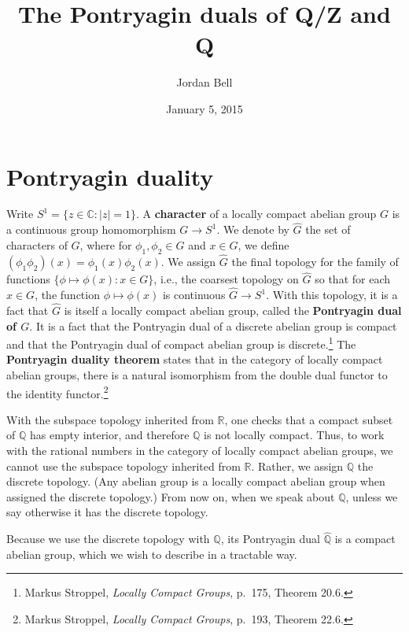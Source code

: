 \documentclass{article}
\theoremstyle{definition}
\theoremstyle{definition}
\begin{document}
\title{The Pontryagin duals of \textbf{Q}/\textbf{Z} and \textbf{Q}}
\author{Jordan Bell}
\date{January 5, 2015}

\maketitle



\section{Pontryagin duality}
Write $S^1=\{z \in \mathbb{C}: |z|=1\}$. 
A \textbf{character} of a locally compact abelian group $G$ is a continuous group homomorphism $G \to S^1$.
We denote by $\widehat{G}$ the set of characters of $G$, where for $\phi_1,\phi_2 \in \widehat{G}$ and $x \in G$,
we define $(\phi_1 \phi_2)(x)=\phi_1(x)\phi_2(x)$. We assign $\widehat{G}$ the final topology for the family of functions
$\{\phi \mapsto \phi(x): x \in G\}$, i.e., the coarsest topology on $\widehat{G}$ so that for each $x \in G$, the function $\phi \mapsto \phi(x)$ is continuous
$\widehat{G} \to S^1$. With this topology, it is a fact that $\widehat{G}$ is itself a locally compact abelian group, called  the \textbf{Pontryagin dual of $G$}.
It is a fact that the Pontryagin dual of a discrete abelian group is compact and that the Pontryagin dual of compact abelian group is discrete.\footnote{Markus Stroppel, {\em Locally Compact Groups},
p.~175, Theorem 20.6.}
The \textbf{Pontryagin duality theorem} states that in the category
of locally compact abelian groups, there is a natural
isomorphism from the double dual functor to the identity functor.\footnote{Markus Stroppel, {\em Locally Compact Groups},
p.~193, Theorem 22.6.}


With the subspace topology inherited from
$\mathbb{R}$, one checks that
a compact subset of $\mathbb{Q}$ has empty
interior, and therefore $\mathbb{Q}$ is not locally compact.
Thus, to work with the rational numbers in the category of locally compact abelian groups, we cannot use the subspace topology inherited from
$\mathbb{R}$. Rather, we assign $\mathbb{Q}$ the discrete topology. (Any abelian group is a locally compact abelian group when assigned the discrete
topology.) From now on, when we speak about $\mathbb{Q}$, unless we say otherwise it has the discrete topology.

Because we use the discrete topology with $\mathbb{Q}$, its Pontryagin
dual $\widehat{\mathbb{Q}}$ is a compact abelian group, which we wish to describe in a tractable way. 
\end{document}
